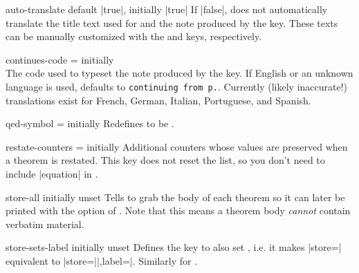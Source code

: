 \documentclass{ltxdoc}
\newcommand{\ttbraces}[1]{\braces{\texttt{#1}}}
\begin{document}
\begin{docKey}{auto-translate}
  {}
  {default |true|, initially |true|}
If |false|,  does not automatically translate the title text used for  and the note produced by the  key.
These texts can be manually customized with the  and  keys, respectively.
\end{docKey}

\begin{docKey}{continues-code}
  {=}
  {initially\\ \ttbraces{keythms\string_continues}\ttbraces{\#1}}
The code used to typeset the note produced by the  key.
If English or an unknown language is used, defaults to \texttt{continuing from p.}\cs{,}\ttbraces{\#1}.
Currently (likely inaccurate!) translations exist for French, German, Italian, Portuguese, and Spanish.
\end{docKey}

\begin{docKey}{qed-symbol}
  {=}
  {initially }
Redefines  to be .
\end{docKey}

\begin{docKey}{restate-counters}
  {=}
  {initially \ttbraces{equation}}
Additional counters whose values are preserved when a theorem is restated.
This key does not reset the list, so you don't need to include |equation| in .
\end{docKey}

\begin{docKey}{store-all}
  {}
  {initially unset}
Tells  to grab the body of each theorem so it can later be printed with the  option of .
Note that this means a theorem body \emph{cannot} contain verbatim material.
\end{docKey}

\begin{docKey}{store-sets-label}
  {}
  {initially unset}
Defines the  key to also set , i.e. it makes |store=| equivalent to |store=||,label=|. Similarly for .
\end{docKey}
\end{document}
